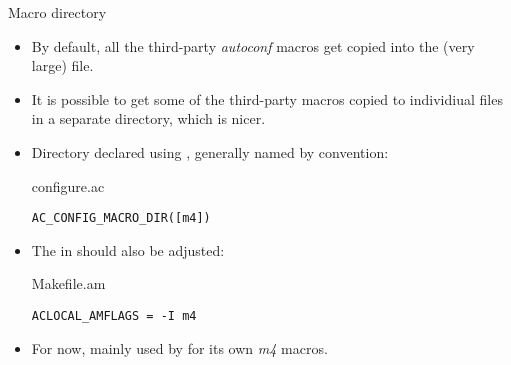 \begin{frame}[fragile]{Macro directory}

  \begin{itemize}

  \item By default, all the third-party {\em autoconf} macros get
    copied into the (very large)  file.

  \item It is possible to get some of the third-party macros copied to
    individiual files in a separate directory, which is nicer.

  \item Directory declared using , generally
    named  by convention:
    \begin{block}{configure.ac}
      \begin{verbatim}
AC_CONFIG_MACRO_DIR([m4])
\end{verbatim}
\end{block}

\item The  in  should also be
  adjusted:

\begin{block}{Makefile.am}
  \begin{verbatim}
ACLOCAL_AMFLAGS = -I m4
\end{verbatim}
\end{block}

\item For now, mainly used by  for its own {\em m4}
  macros.

  \end{itemize}

\end{frame}

